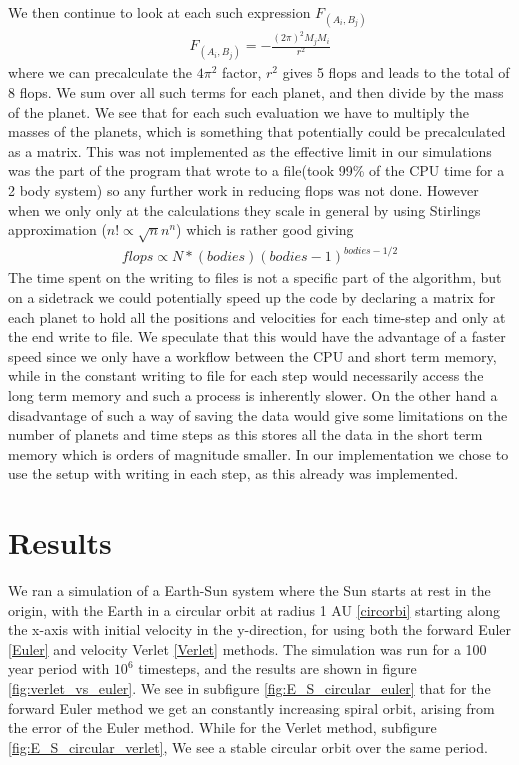 \documentclass[a4paper,11pt]{article}
\begin{document}
{\begin{align}
\end{align}
We then continue to look at each such expression $F_{(A_i,B_j)}$
\begin{align}
F_{(A_i,B_j)}= -\frac{(2\pi)^2 M_j M_i}{r^2}
\end{align}
where we can precalculate the $4\pi^2$ factor, $r^2$ gives 5 flops and leads to the total of 8 flops. We sum over all such terms for each planet, and then divide by the mass of the planet. We see that for each such evaluation we have to multiply the masses of the planets, which is something that potentially could be precalculated as a matrix. This was not implemented as the effective limit in our simulations was the part of the program that wrote to a file(took 99\% of the CPU time for a 2 body system) so any further work in reducing flops was not done. However when we only only at the calculations they scale in general by using Stirlings approximation ($n! \propto \sqrt{n}n^n$) which is rather good giving
\begin{align}
	flops \propto N * (bodies)(bodies-1)^{bodies-1/2}
\end{align}
The time spent on the writing to files is not a specific part of the algorithm, but on a sidetrack we could potentially speed up the code by declaring a matrix for each planet to hold all the positions and velocities for each time-step and only at the end write to file. We speculate that this would have the advantage of a faster speed since we only have a workflow between the CPU and short term memory, while in the constant writing to file for each step would necessarily access the long term memory and such a process is inherently slower. On the other hand a disadvantage of such a way of saving the data would give some limitations on the number of planets and time steps as this stores all the data in the short term memory which is orders of magnitude smaller. In our implementation we chose to use the setup with writing in each step, as this already was implemented. 



\section*{Results}

We ran a simulation of a Earth-Sun system where the Sun starts at rest in the origin, with the Earth in a circular orbit at radius 1 AU \ref{circorbi} starting along the x-axis with initial velocity in the y-direction, for using both the forward Euler \ref{Euler} and velocity Verlet \ref{Verlet} methods. The simulation was run for a 100 year period with $10^{6}$ timesteps, and the results are shown in figure \ref{fig:verlet_vs_euler}. We see in subfigure \ref{fig:E_S_circular_euler} that for the forward Euler method we get an constantly increasing spiral orbit, arising from the error of the Euler method. While for the Verlet method, subfigure \ref{fig:E_S_circular_verlet}, We see a stable circular orbit over the same period.

}
\end{document}
